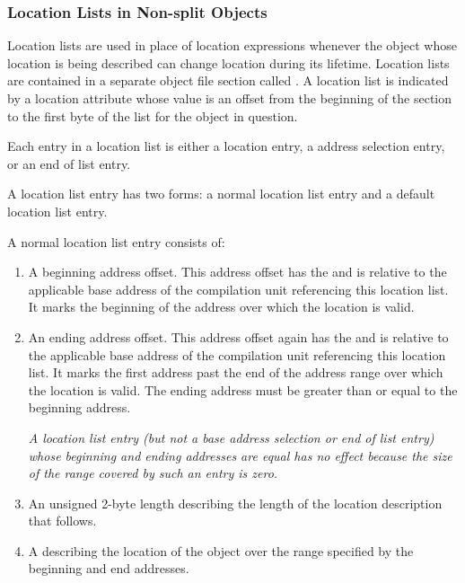 \subsubsection{Location Lists in Non-split Objects}
\label{chap:locationlistsinnonsplitobjects}
Location lists 
are used in place of location expressions
whenever the object whose location is being described
can change location during its lifetime. 
Location lists
are contained in a separate object file section called
\dotdebugloc{}. A location list is indicated by a location
attribute whose value is an offset from the beginning of
the \dotdebugloc{} section to the first byte of the list for the
object in question.

Each entry in a location list is either a location 
entry,
a 
address selection entry, 
or an 
end of list entry.

A location list entry has two forms:
a normal location list entry and a default location list entry.

A 
normal location list entry consists of:
\begin{enumerate}[1. ]
\item A beginning address offset. 
This address offset has the  and is
relative to the applicable base address of the compilation
unit referencing this location list. It marks the beginning
of the address 
over which the location is valid.

\item An ending address offset.  This address offset again
has the  and is relative to the applicable
base address of the compilation unit referencing this location
list. It marks the first address past the end of the address
range over which the location is valid. The ending address
must be greater than or equal to the beginning address.

\textit{A location list entry (but not a base address selection or 
end of list entry) whose beginning
and ending addresses are equal has no effect 
because the size of the range covered by such
an entry is zero.}

\item An unsigned 2-byte length describing the length of the location 
description that follows.

\item A  
describing the location of the object over the range specified by
the beginning and end addresses.
\end{enumerate}

